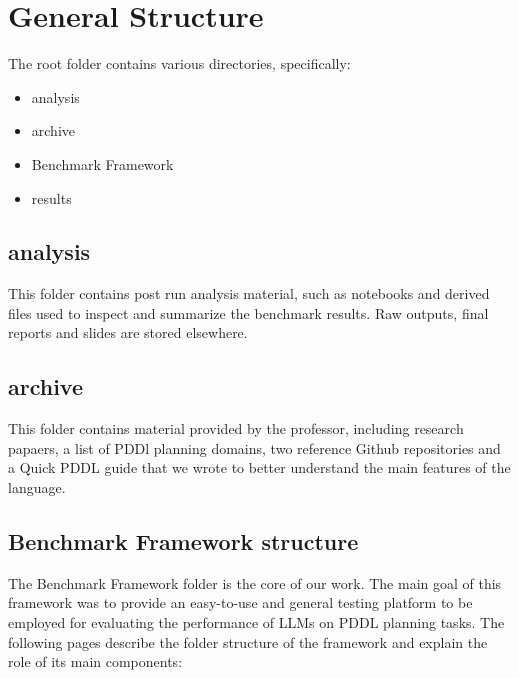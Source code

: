 \section{General Structure}
The root folder contains various directories, specifically:
\begin{itemize}
    \item analysis
    \item archive
    \item Benchmark Framework
    \item results
\end{itemize}

\subsection{analysis}
This folder contains post run analysis material, such as notebooks and derived files used to inspect and summarize the benchmark results. Raw outputs, final reports and slides are stored elsewhere.

\subsection{archive}
This folder contains material provided by the professor, including research papaers, a list of PDDl planning domains, two reference Github repositories and a Quick PDDL guide that we wrote to better understand the main features of the language.  

\subsection{Benchmark Framework structure}
The Benchmark Framework folder is the core of our work. The main goal of this framework was to provide an easy-to-use and general testing platform to be employed for evaluating the performance of LLMs on PDDL planning tasks. 
The following pages describe the folder structure of the framework and explain the role of its main components:

\vspace{0.2cm}


